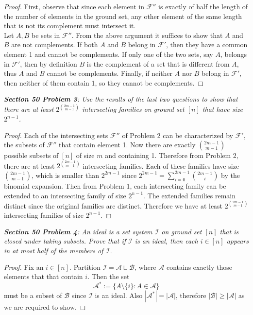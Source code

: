 \documentclass{article}
\begin{document}
  \begin{proof}
    First, observe that since each element in $\mathcal{F}''$ is exactly of
    half the length of the number of elements in the ground set, any other
    element of the same length that is not its complement must intersect
    it. \\

    Let $A,B$ be sets in $\mathcal{F}''$. From the above argument it
    suffices to show that $A$ and $B$ are not complements. If both $A$ and
    $B$ belong in $\mathcal{F}'$, then they have a common element 1 and
    cannot be complements. If only one of the two sets, say $A$,
    belongs in $\mathcal{F}'$, then by definition $B$ is the complement of
    a set that is different from $A$, thus $A$ and $B$ cannot be
    complements. Finally, if neither $A$ nor $B$ belong in $\mathcal{F}'$,
    then neither of them contain 1, so they cannot be complements.
  \end{proof}

\it \textbf{Section 50 Problem 3}: Use the results of the last two
  questions to show that there are at least $2^{\binom{2m-1}{m-1}}$
  intersecting families on ground set $[n]$ that have size $2^{n-1}$.

  \begin{proof}
    Each of the intersecting sets $\mathcal{F}''$ of Problem 2 can be
    characterized by $\mathcal{F}'$, the subsets of $\mathcal{F}''$ that
    contain element 1. Now there are exactly $\binom{2m-1}{m-1}$ possible
    subsets of $[n]$ of size $m$ and containing 1. Therefore from Problem
    2, there are at least $2^{\binom{2m-1}{m-1}}$ intersecting families.
    Each of these families have size $\binom{2m-1}{m-1}$, which is smaller
    than $2^{2m-1}$ since $2^{2m-1}=\sum_{i=0}^{2m-1} \binom{2m-1}{i}$ by
    the binomial expansion. Then from Problem 1, each intersecting family
    can be extended to an intersecting family of size $2^{n-1}$. The
    extended families remain distinct since the original families are
    distinct. Therefore we have at least $2^{\binom{2m-1}{m-1}}$
    intersecting families of size $2^{n-1}$.
  \end{proof}

\it \textbf{Section 50 Problem 4}: An ideal is a set system $\mathcal{I}$
  on ground set $[n]$ that is closed under taking subsets. Prove that if
  $\mathcal{I}$ is an ideal, then each $i\in[n]$ appears in at most half of
  the members of $\mathcal{I}$.

  \begin{proof}
    Fix an $i\in[n]$. Partition $\mathcal{I}=\mathcal{A}\sqcup
    \mathcal{B}$, where $\mathcal{A}$ contains exactly those elements that
    that contain $i$. Then the set
    \[\mathcal{A}^*:=\{A\setminus\{i\}: A\in\mathcal{A}\}\]
    must be a subset of $\mathcal{B}$ since $\mathcal{I}$ is an ideal. Also
    $|\mathcal{A}^*|=|\mathcal{A}|$, therefore
    $|\mathcal{B}|\geq|\mathcal{A}|$ as we are required to show.
  \end{proof}
\end{document}
